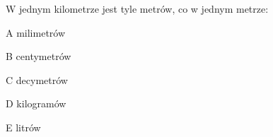 \begin{tresc}
W jednym kilometrze jest tyle metrów, co w jednym metrze:
\end{tresc}
\begin{wariant}{A} milimetrów \end{wariant}
\begin{wariant}{B} centymetrów \end{wariant}
\begin{wariant}{C} decymetrów \end{wariant}
\begin{wariant}{D} kilogramów \end{wariant}
\begin{wariant}{E} litrów \end{wariant}
